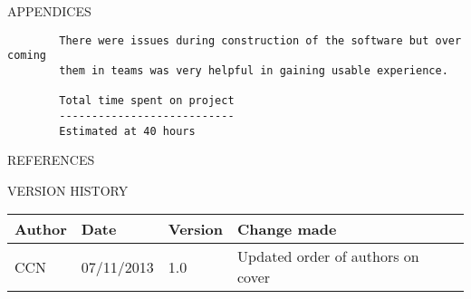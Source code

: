 \documentclass{article}
\newcommand{\versionhistory}{
		\begin{tabularx}{\linewidth}{| p{2cm} | p{2cm} | p{2cm} | X | }
			\hline
			\bf{Author} & \bf{Date} & \bf{Version} & \bf{Change made} \\
			\hline
			CCN & 07/11/2013 & 1.0 & Updated order of authors on cover \\
			\hline
		\end{tabularx}
}
\begin{document}
\begin{section}{APPENDICES}
\begin{verbatim}
		There were issues during construction of the software but over coming 
		them in teams was very helpful in gaining usable experience.
		
		Total time spent on project
		---------------------------
		Estimated at 40 hours
		\end{verbatim}
		
		
		
		
		
	
		
		
		
	\end{section}

	\nocite{LaTeXTemplate} %
	\nocite{ProjDocs}

	\newpage
	\begin{section}{REFERENCES}
		
		
	\end{section}
	
	\vspace{1cm}
	\begin{section}{VERSION HISTORY}
		\versionhistory
	\end{section}
\end{document}
